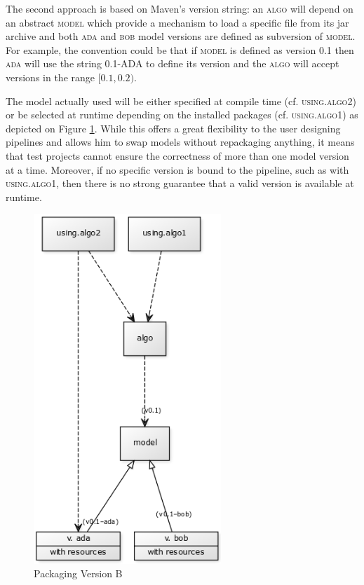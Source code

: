\documentclass{article}
\newcommand{\ID}[1]{{\textsc{#1}}}
\begin{document}
The second approach is based on Maven's version string: an \ID{algo} will depend on an abstract \ID{model} which provide a mechanism to load a specific file from its jar archive and both \ID{ada} and \ID{bob} model versions are defined as subversion of \ID{model}. For example, the convention could be that if \ID{model} is defined as version \ID{0.1} then \ID{ada} will use the string \ID{0.1-ADA} to define its version and the \ID{algo} will accept versions in the range $ [0.1,0.2) $.

The model actually used will be either specified at compile time (cf. \ID{using.algo2}) or be selected at runtime depending on the installed packages (cf. \ID{using.algo1}) as depicted on Figure \ref{fig:pkgsysB}. While this offers a great flexibility to the user designing pipelines and allows him to swap models without repackaging anything, it means that test projects cannot ensure the correctness of more than one model version at a time. Moreover, if no specific version is bound to the pipeline, such as with \ID{using.algo1}, then there is no strong guarantee that a valid version is available at runtime.

\begin{figure}
\centering
\includegraphics[width=200pt]{res/packaging_version_B.png}
\caption{Packaging Version B}
\label{fig:pkgsysB}
\end{figure}
\end{document}
